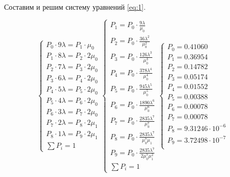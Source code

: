Составим и решим систему уравнений \ref{eq:1}.

\begin{equation}
\label{eq:1}
\begin{cases}
	P_0 \cdot 9 \lambda = P_1 \cdot \mu_0 \\
	P_1 \cdot 8 \lambda = P_2 \cdot 2 \mu_0 \\
	P_2 \cdot 7 \lambda = P_3 \cdot 2 \mu_0 \\
	P_3 \cdot 6 \lambda = P_4 \cdot 2 \mu_0 \\
	P_4 \cdot 5 \lambda = P_5 \cdot 2 \mu_0 \\
	P_5 \cdot 4 \lambda = P_6 \cdot 2 \mu_0 \\
	P_6 \cdot 3 \lambda = P_7 \cdot 2 \mu_0 \\
	P_7 \cdot 2 \lambda = P_8 \cdot 2 \mu_1 \\
	P_8 \cdot 1 \lambda = P_9 \cdot 2 \mu_1 \\
	\sum P_i = 1
\end{cases}
\begin{cases}
	P_1 = P_0 \cdot \frac{9 \lambda}{\mu_0} \\
	P_2 = P_0 \cdot \frac{36 \lambda^2}{\mu_0^2} \\
	P_3 = P_0 \cdot \frac{126 \lambda^3}{\mu_0^3} \\
	P_4 = P_0 \cdot \frac{378 \lambda^4}{\mu_0^4} \\
	P_5 = P_0 \cdot \frac{945 \lambda^5}{\mu_0^5} \\
	P_6 = P_0 \cdot \frac{1890 \lambda^6}{\mu_0^6} \\
	P_7 = P_0 \cdot \frac{2835 \lambda^7}{\mu_0^7} \\
	P_8 = P_0 \cdot \frac{2835 \lambda^7}{\mu_0^7 \mu_1} \\
	P_9 = P_0 \cdot \frac{2835 \lambda^7}{2 \mu_0^7 \mu_1^2} \\
	\sum P_i = 1
\end{cases}
\begin{cases}
	P_0 = 0.41060 \\
	P_1 = 0.36954 \\
	P_2 = 0.14782 \\
	P_3 = 0.05174 \\
	P_4 = 0.01552 \\
	P_5 = 0.00388 \\
	P_6 = 0.00078 \\
	P_7 = 0.00078 \\ 
	P_8 = 9.31246 \cdot 10^{-6} \\
	P_9 = 3.72498 \cdot 10^{-7} \\
\end{cases}
\end{equation}

